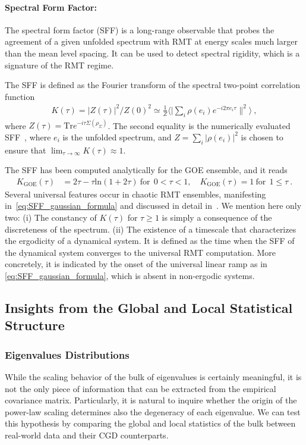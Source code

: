 \documentclass{article}
\DeclareMathOperator{\tr}{tr}
\def\tr{\textrm{Tr}}
\begin{document}
%
\paragraph{Spectral Form Factor:}
The spectral form factor (SFF) is a long-range observable that probes the agreement of a given unfolded spectrum with RMT at energy scales much larger than the mean level spacing. It can be used to detect spectral rigidity, which is a signature of the RMT regime.

The SFF is defined as the Fourier transform of the spectral two-point correlation function~\citep{Shenker_et_al_SFF_first,Liu_2018}
\begin{align}
    \label{eq:SFF_def}
    K(\tau) = {|Z(\tau)|^2}/{Z(0)^2}
    \simeq
    \frac{1}{Z}
    \big\langle
    |{\sum_{i} \rho(e_i) e^{- i 2 \pi e_i \tau}}
    \|^2 
    \big
    \rangle 
    \ ,
\end{align}
where $Z(\tau) = \tr e^{- i \tau \Sigma( \rho_\Sigma)}$. 
The second equality is the numerically evaluated SFF~\citep{vidmar_1905.06345}, where $e_i$ is the unfolded spectrum, and $Z =  \sum_i |{\rho(e_i)}|^2$ is chosen to ensure that $\lim_{\tau\to\infty}K(\tau) \approx 1$.

The SFF has been computed analytically for the GOE ensemble, and it reads
\begin{align}
\label{eq:SFF_gaussian_formula}
K_{\mathrm{GOE}}(\tau) &= 2\tau - \tau  \mathrm{ln}(1 + 2\tau) \
\text{for}~~0 < \tau < 1, \quad
K_{\mathrm{GOE}}(\tau) = 1 
\
\text{for}~~ 1 \leq \tau 
\ .
\end{align}
Several universal features occur in chaotic RMT ensembles, manifesting in~\cref{eq:SFF_gaussian_formula} and discussed in detail in~\citet{Liu_2018,Kim_2023}. We mention here only two: (i) The
constancy of $K(\tau)$ for $\tau \geq 1$ is simply a consequence of the discreteness of the spectrum.
(ii) The existence of a timescale that characterizes the ergodicity of a dynamical system. It is defined as the time when the SFF of the dynamical system converges to the universal RMT computation. More concretely, it is indicated by the onset of the universal linear ramp as in \eqref{eq:SFF_gaussian_formula},
which is absent in non-ergodic systems. 

\subsection{Insights from the Global and Local Statistical Structure}

\subsubsection{Eigenvalues Distributions}
While the scaling behavior of the bulk of eigenvalues is certainly meaningful, it is not the only piece of information that can be extracted from the empirical covariance matrix. Particularly, it is natural to inquire whether the origin of the power-law scaling determines also the degeneracy of each eigenvalue. We can test this hypothesis by comparing the global and local statistics of the bulk between real-world data and their CGD counterparts.
\end{document}
